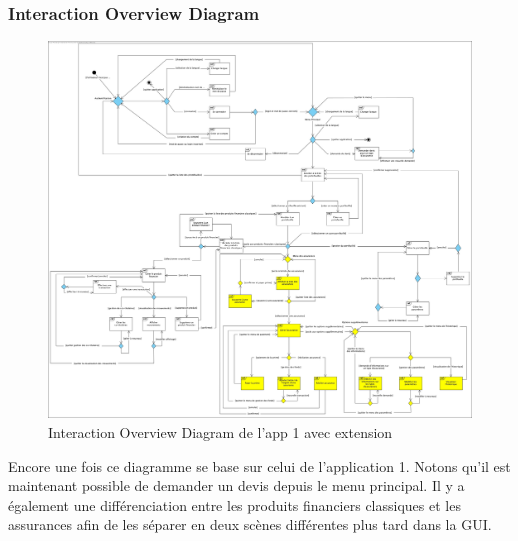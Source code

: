 \documentclass[../rapport.tex]{subfiles}
\begin{document}
		\subsubsection{Interaction Overview Diagram}
				\begin{figure}[h]
						\centering\includegraphics[scale=0.15]{ressources/photos_diagrammes/extensionThomas/intOver1Thomas.jpg}
						\caption{Interaction Overview Diagram de l'app 1 avec extension}
				\end{figure}
		Encore une fois ce diagramme se base sur celui de l'application 1. Notons qu'il est
		maintenant possible de demander un devis depuis le menu principal. Il y a également une 
		différenciation entre les produits financiers classiques et les assurances afin de les 
		séparer en deux scènes différentes plus tard dans la GUI.

\newpage
\end{document}
